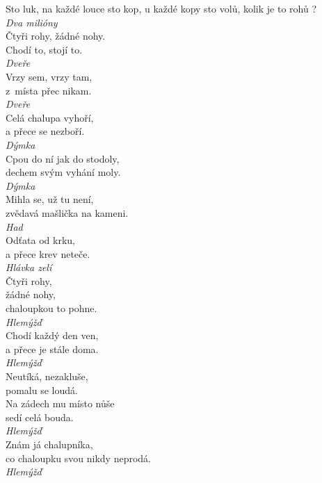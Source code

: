 \begin{multicols}{4}
\noindent
Sto luk, na každé louce sto kop, u každé kopy sto volů, kolik
je to rohů ?\\[1 mm]
{\sl Dva milióny}\\

\noindent
Čtyři rohy, žádné nohy.\\
Chodí to, stojí to.\\[1 mm]
{\sl Dveře}\\

\noindent
Vrzy sem, vrzy tam,\\
z~místa přec nikam.\\[1 mm]
{\sl Dveře}\\

\noindent
Celá chalupa vyhoří,\\
a přece se nezboří.\\[1 mm]
{\sl Dýmka}\\

\noindent
Cpou do ní jak do stodoly,\\
dechem svým vyhání moly.\\[1 mm]
{\sl Dýmka}\\

\noindent
Mihla se, už tu není,\\
zvědavá mašlička na kameni.\\[1 mm]
{\sl Had}\\

\noindent
Odťata od krku,\\
a přece krev neteče.\\[1 mm]
{\sl Hlávka zelí}\\

\noindent
Čtyři rohy,\\
žádné nohy,\\
chaloupkou to pohne.\\[1 mm]
{\sl Hlemýžď}\\

\noindent
Chodí každý den ven,\\
a přece je stále doma.\\[1 mm]
{\sl Hlemýžď}\\

\noindent
Neutíká, nezakluše,\\
pomalu se loudá.\\
Na zádech mu místo nůše\\
sedí celá bouda.\\[1 mm]
{\sl Hlemýžď}\\

\noindent
Znám já chalupníka,\\
co chaloupku svou nikdy neprodá.\\[1 mm]
{\sl Hlemýžď}\\


\end{multicols}
